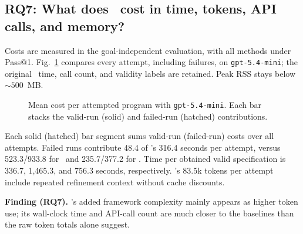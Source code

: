
\subsection{RQ7: What does \toolname\ cost in time, tokens, API calls, and memory?}
\label{subsec:rq7-cost}

Costs are measured in the goal-independent evaluation, with all methods
under Pass@1. {Fig.~\ref{fig:rq7-cost} compares every attempt, including
failures, on \texttt{gpt-5.4-mini}; the original \autospec\ time, call count,
and validity labels are retained.} Peak RSS stays below \(\sim 500\)~MB.

\begin{figure}[t]
\centering

\caption{{Mean cost per attempted program with \texttt{gpt-5.4-mini}. Each bar stacks the valid-run (solid) and failed-run (hatched) contributions.}}
\label{fig:rq7-cost}
\end{figure}

{Each solid (hatched) bar segment sums valid-run (failed-run) costs over
all attempts. Failed runs contribute 48.4 of \toolname's 316.4 seconds
per attempt, versus 523.3/933.8 for \autospec\ and 235.7/377.2 for
\specgen. Time per obtained valid specification is 336.7, 1,465.3, and
756.3 seconds, respectively. \toolname's 83.5k tokens per attempt include
repeated refinement context without cache discounts.}

\begin{finding}
\textbf{Finding (RQ7).} {\toolname's added framework complexity mainly appears as higher token use; its wall-clock time and API-call count are much closer to the baselines than the raw token totals alone suggest.}
\end{finding}
